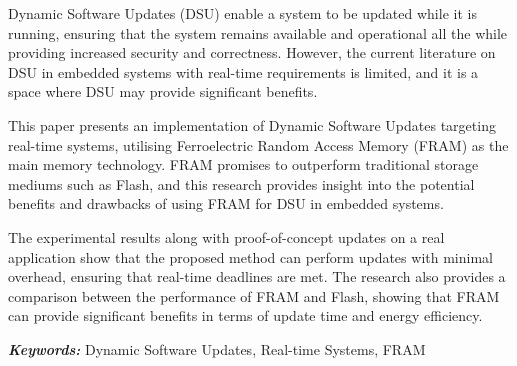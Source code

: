 Dynamic Software Updates (DSU) enable a system to be updated while it is running, ensuring that the system remains available and operational all the while providing increased security and correctness. However, the current literature on DSU in embedded systems with real-time requirements is limited, and it is a space where DSU may provide significant benefits. 

This paper presents an implementation of Dynamic Software Updates targeting real-time systems, utilising Ferroelectric Random Access Memory (FRAM) as the main memory technology. FRAM promises to outperform traditional storage mediums such as Flash, and this research provides insight into the potential benefits and drawbacks of using FRAM for DSU in embedded systems. 

The experimental results along with proof-of-concept updates on a real application show that the proposed method can perform updates with minimal overhead, ensuring that real-time deadlines are met. The research also provides a comparison between the performance of FRAM and Flash, showing that FRAM can provide significant benefits in terms of update time and energy efficiency.

\textbf{\textit{Keywords:}} Dynamic Software Updates, Real-time Systems, FRAM
